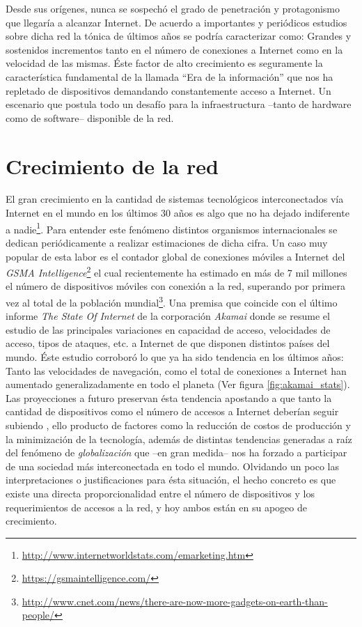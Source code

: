\begin{intro}
Desde sus orígenes, nunca se sospechó el grado de penetración y protagonismo que llegaría a alcanzar Internet. De acuerdo a importantes y periódicos estudios sobre dicha red \cite{report:akamai} la tónica de últimos años se podría caracterizar como: Grandes y sostenidos incrementos tanto en el número de conexiones a Internet como en la velocidad de las mismas. Éste factor de alto crecimiento es seguramente la característica fundamental de la llamada ``Era de la información'' que nos ha repletado de dispositivos demandando constantemente acceso a Internet. Un escenario que postula todo un desafío para la infraestructura --tanto de hardware como de software-- disponible de la red.

\section*{Crecimiento de la red}
El gran crecimiento en la cantidad de sistemas tecnológicos interconectados vía Internet en el mundo en los últimos 30 años es algo que no ha dejado indiferente a nadie\footnote{\url{http://www.internetworldstats.com/emarketing.htm}}. Para entender este fenómeno distintos organismos internacionales se dedican periódicamente a realizar estimaciones de dicha cifra. Un caso muy popular de esta labor es el contador global de conexiones móviles a Internet del \emph{GSMA Intelligence}\footnote{\url{https://gsmaintelligence.com/}} el cual recientemente ha estimado en más de 7 mil millones el número de dispositivos móviles con conexión a la red, superando por primera vez al total de la población mundial\footnote{\url{http://www.cnet.com/news/there-are-now-more-gadgets-on-earth-than-people/}}. Una premisa que coincide con el último informe \emph{The State Of Internet} de la corporación \emph{Akamai} \cite{report:akamai} donde se resume el estudio de las principales variaciones en capacidad de acceso, velocidades de acceso, tipos de ataques, etc. a Internet de que disponen distintos países del mundo. Éste estudio corroboró lo que ya ha sido tendencia en los últimos años: Tanto las velocidades de navegación, como el total de conexiones a Internet han aumentado generalizadamente en todo el planeta (Ver figura \ref{fig:akamai_stats}). Las proyecciones a futuro preservan ésta tendencia apostando a que tanto la cantidad de dispositivos como el número de accesos a Internet deberían seguir subiendo \cite{nota:2020}, ello producto de factores como la reducción de costos de producción y la minimización de la tecnología, además de distintas tendencias generadas a raíz del fenómeno de \emph{globalización} que --en gran medida-- nos ha forzado a participar de una sociedad más interconectada en todo el mundo. Olvidando un poco las interpretaciones o justificaciones para ésta situación, el hecho concreto es que existe una directa proporcionalidad entre el número de dispositivos y los requerimientos de accesos a la red, y hoy ambos están en su apogeo de crecimiento.


\end{intro}
